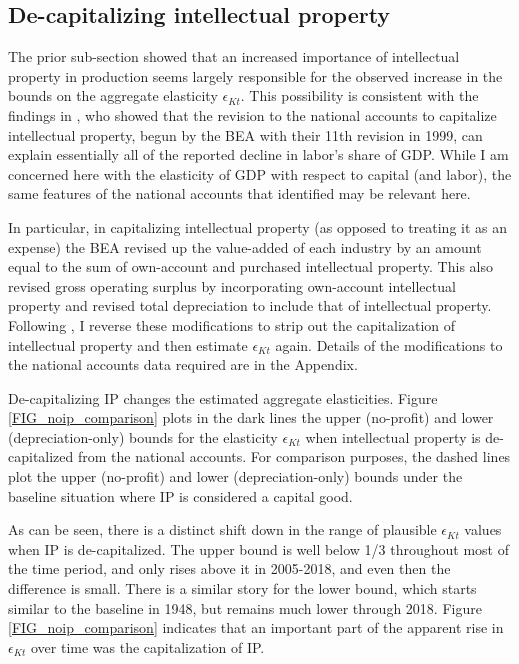 \documentclass[11pt]{article}
\begin{document}
\subsection{De-capitalizing intellectual property}\label{SEC_decapip}
The prior sub-section showed that an increased importance of intellectual property in production seems largely responsible for the observed increase in the bounds on the aggregate elasticity $\epsilon_{Kt}$. This possibility is consistent with the findings in \cite{ksz2020}, who showed that the revision to the national accounts to capitalize intellectual property, begun by the BEA with their 11th revision in 1999, can explain essentially all of the reported decline in labor's share of GDP. While I am concerned here with the elasticity of GDP with respect to capital (and labor), the same features of the national accounts that \cite{ksz2020} identified may be relevant here. 

In particular, in capitalizing intellectual property (as opposed to treating it as an expense) the BEA revised up the value-added of each industry by an amount equal to the sum of own-account and purchased intellectual property. This also revised gross operating surplus by incorporating own-account intellectual property and revised total depreciation to include that of intellectual property. Following \cite{ksz2020}, I reverse these modifications to strip out the capitalization of intellectual property and then estimate $\epsilon_{Kt}$ again. Details of the modifications to the national accounts data required are in the Appendix.

De-capitalizing IP changes the estimated aggregate elasticities. Figure \ref{FIG_noip_comparison} plots in the dark lines the upper (no-profit) and lower (depreciation-only) bounds for the elasticity $\epsilon_{Kt}$ when intellectual property is de-capitalized from the national accounts. For comparison purposes, the dashed lines plot the upper (no-profit) and lower (depreciation-only) bounds under the baseline situation where IP is considered a capital good. 

As can be seen, there is a distinct shift down in the range of plausible $\epsilon_{Kt}$ values when IP is de-capitalized. The upper bound is well below 1/3 throughout most of the time period, and only rises above it in 2005-2018, and even then the difference is small. There is a similar story for the lower bound, which starts similar to the baseline in 1948, but remains much lower through 2018. Figure \ref{FIG_noip_comparison} indicates that an important part of the apparent rise in $\epsilon_{Kt}$ over time was the capitalization of IP. 
\end{document}
